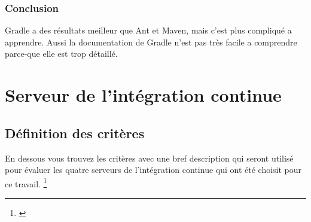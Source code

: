 \subsubsection{Conclusion}
Gradle a des résultats meilleur que Ant et Maven, mais c'est plus compliqué a apprendre. Aussi la documentation de Gradle n'est pas très facile a comprendre parce-que elle est trop détaillé.
\newpage
\section{Serveur de l'intégration continue}

\subsection{Définition des critères}

En dessous vous trouvez les critères avec une bref description qui seront utilisé pour évaluer les quatre serveurs de l'intégration continue qui ont été choisit pour ce travail. \footnote{\cite{ibmciserver}}

